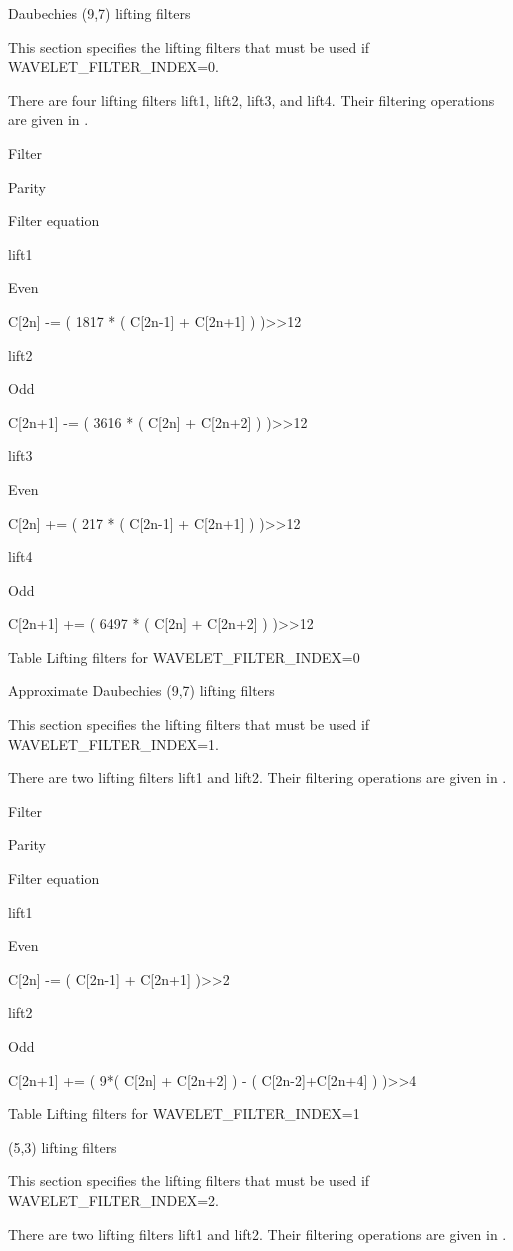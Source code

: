      Daubechies (9,7) lifting filters

This section specifies the lifting filters that must be used if
WAVELET\_FILTER\_INDEX=0.

There are four lifting filters lift1, lift2, lift3, and lift4. Their
filtering operations are given in .


Filter

Parity

Filter equation

lift1

Even

C[2n] -= ( 1817 * ( C[2n-1] + C[2n+1] ) )>>12

lift2

Odd

C[2n+1] -= ( 3616 * ( C[2n] + C[2n+2] ) )>>12

lift3

Even

C[2n] += ( 217 * ( C[2n-1] + C[2n+1] ) )>>12

lift4

Odd

C[2n+1] += ( 6497 * ( C[2n] + C[2n+2] ) )>>12


Table   Lifting filters for WAVELET\_FILTER\_INDEX=0



    Approximate Daubechies (9,7) lifting filters

This section specifies the lifting filters that must be used if
WAVELET\_FILTER\_INDEX=1.

There are two lifting filters lift1 and lift2. Their filtering
operations are given in .


Filter

Parity

Filter equation

lift1

Even

C[2n] -=  ( C[2n-1] + C[2n+1] )>>2

lift2

Odd

C[2n+1] += ( 9*( C[2n] + C[2n+2] ) - ( C[2n-2]+C[2n+4] ) )>>4


Table   Lifting filters for WAVELET\_FILTER\_INDEX=1


    (5,3) lifting filters

This section specifies the lifting filters that must be used if
WAVELET\_FILTER\_INDEX=2.

There are two lifting filters lift1 and lift2. Their filtering
operations are given in .


